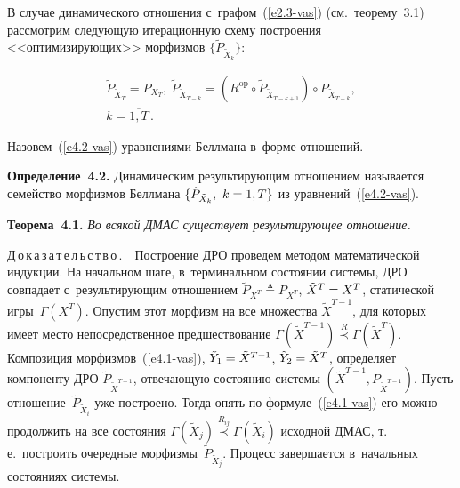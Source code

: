 \begin{multicols}{2}
    В случае динамического отношения с~графом~(\ref{e2.3-vas}) (см.\ 
тео\-ре\-му~3.1) рас\-смот\-рим сле\-ду\-ющую итерационную схему по\-стро\-ения 
<<оп\-ти\-ми\-зи\-ру\-ющих>> морфизмов $\{ \tilde{P}_{\tilde{X}_k}\}$:

\vspace*{-4pt}

\noindent
    \begin{multline}
    \tilde{P}_{\tilde{X}_T} =P_{X_T},\ \tilde{P}_{\tilde{X}_{T-k}} =\left( 
R^{\mathrm{op}}\circ \tilde{P}_{\tilde{X}_{T-k+1}}\right) \circ P_{\tilde{X}_{T-k}},\\
    k=\overline{1, T}\,.
    \label{e4.2-vas}
    \end{multline}
    
    \vspace*{-4pt}

\noindent
Назовем~(\ref{e4.2-vas}) уравнениями Беллмана в~форме отношений. 
    
    \smallskip
    
    \noindent
    \textbf{Определение~4.2.} Динамическим ре\-зуль\-ти\-ру\-ющим отношением 
называется семейство морфизмов Беллмана $\{ \tilde{P}_{\tilde{X}_k},\ k\hm= 
\overline{1, T}\}$ из уравнений~(\ref{e4.2-vas}).
    
    \smallskip
    
    \noindent
    \textbf{Теорема~4.1.} \textit{Во всякой ДМАС существует ре\-зу\-ль\-ти\-ру\-ющее 
отношение.}
    
    \smallskip
    
    \noindent
    Д\,о\,к\,а\,з\,а\,т\,е\,л\,ь\,с\,т\,в\,о\,.\ \ Построение ДРО проведем методом 
математической индукции. На начальном шаге, в~терминальном со\-сто\-янии сис\-те\-мы, 
ДРО совпадает с~ре\-зуль\-ти\-ру\-ющим отношением $\tilde{P}_{X^T} \triangleq 
P_{X^T}$, $\tilde{X}^T\hm= X^T$, статической игры~$\Gamma(X^T)$. Опус\-тим 
этот морфизм на все множества $\tilde{X}^{T-1}$, для которых имеет мес\-то 
непосредственное предшествование $\Gamma(\tilde{X}^{T-1}) \overset{R}{\prec} 
\Gamma(\tilde{X}^T)$. Композиция морфизмов~(\ref{e4.1-vas}), $\tilde{Y}_1\hm= 
\tilde{X}^{T-1}$, $\tilde{Y}_2\hm= \tilde{X}^T$, определяет компоненту ДРО 
$\tilde{P}_{\tilde{X}^{T-1}}$, от\-ве\-ча\-ющую со\-сто\-янию сис\-те\-мы $(\tilde{X}^{T-1}, 
P_{\tilde{X}^{T-1}})$. Пусть отношение~$\tilde{P}_{\tilde{X}_i}$ уже построено. 
Тогда опять по формуле~(\ref{e4.1-vas}) его можно продолжить на все со\-сто\-яния 
$\Gamma(\tilde{X}_j) \overset{R_{ij}}{\prec} \Gamma(\tilde{X}_i)$ исходной ДМАС, 
т.\,е.\ построить очередные морфизмы~$\tilde{P}_{\tilde{X}_j}$. Процесс 
завершается в~начальных состояниях сис\-темы. 


\end{multicols}
